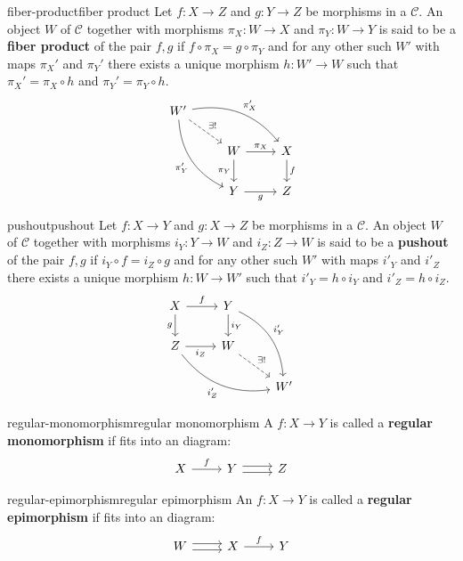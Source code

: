 \begin{topic}{fiber-product}{fiber product}
    Let $f : X \to Z$ and $g : Y \to Z$ be morphisms in a  $\mathcal{C}$. An object $W$ of $\mathcal{C}$ together with morphisms $\pi_X: W \to X$ and $\pi_Y : W \to Y$ is said to be a \textbf{fiber product} of the pair $f, g$ if $f \circ \pi_X = g \circ \pi_Y$ and for any other such $W'$ with maps $\pi_X'$ and $\pi_Y'$ there exists a unique morphism $h : W' \to W$ such that $\pi_X' = \pi_X \circ h$ and $\pi_Y' = \pi_Y \circ h$.
    \[ \begin{tikzcd} W' \arrow[bend left=30]{rrd}{\pi_X'} \arrow[swap, bend right=30]{ddr}{\pi_Y'} \arrow[dashed]{rd}{\exists!} & & \\ & W \arrow{r}{\pi_X} \arrow[swap]{d}{\pi_Y} & X \arrow{d}{f} \\ & Y \arrow[swap]{r}{g} & Z \end{tikzcd} \]
\end{topic}

\begin{topic}{pushout}{pushout}
    Let $f : X \to Y$ and $g : X \to Z$ be morphisms in a  $\mathcal{C}$. An object $W$ of $\mathcal{C}$ together with morphisms $i_Y: Y \to W$ and $i_Z : Z \to W$ is said to be a \textbf{pushout} of the pair $f, g$ if $i_Y \circ f = i_Z \circ g$ and for any other such $W'$ with maps $i'_Y$ and $i'_Z$ there exists a unique morphism $h : W \to W'$ such that $i'_Y = h \circ i_Y$ and $i'_Z = h \circ i_Z$.
    \[ \begin{tikzcd} X \arrow{r}{f} \arrow[swap]{d}{g} & Y \arrow{d}{i_Y} \arrow[bend left=30]{rdd}{i'_Y} & \\ Z \arrow[swap]{r}{i_Z} \arrow[swap, bend right=30]{drr}{i'_Z} & W \arrow[dashed]{rd}{\exists!} & \\ & & W' \end{tikzcd} \]
\end{topic}

\begin{topic}{regular-monomorphism}{regular monomorphism}
    A  $f : X \to Y$ is called a \textbf{regular monomorphism} if fits into an  diagram:
    \[ \begin{tikzcd} X \arrow{r}{f} & Y \arrow[shift left=0.25em]{r} \arrow[shift right=0.25em]{r} & Z \end{tikzcd} \]
\end{topic}

\begin{topic}{regular-epimorphism}{regular epimorphism}
    An  $f : X \to Y$ is called a \textbf{regular epimorphism} if fits into an  diagram:
    \[ \begin{tikzcd} W \arrow[shift left=0.25em]{r} \arrow[shift right=0.25em]{r} & X \arrow{r}{f} & Y \end{tikzcd} \]
\end{topic}

